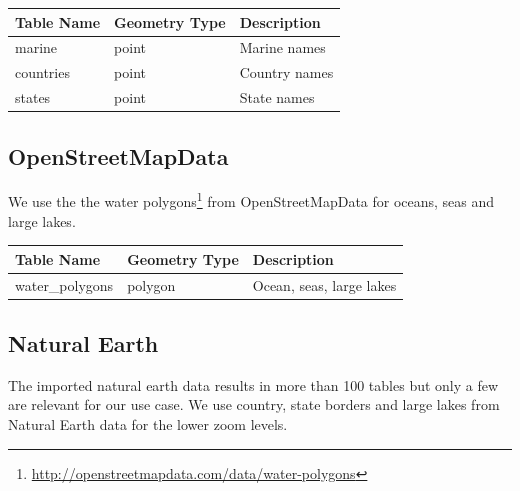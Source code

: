 \begin{flushleft}
    \begin{tabular}{lll}
    \hline
    Table Name   & Geometry Type & Description \\
    \hline                                          
    marine       & point    & Marine names \\
    countries    & point    & Country names \\
    states       & point    & State names \\
    \end{tabular}
\end{flushleft}

\subsection{OpenStreetMapData}

We use the the water polygons\footnote{\url{http://openstreetmapdata.com/data/water-polygons}} 
from OpenStreetMapData for oceans, seas and large lakes.

\begin{flushleft}
    \begin{tabular}{lll}
    \hline
    Table Name            & Geometry Type & Description \\
    \hline
    water\_polygons        & polygon       & Ocean, seas, large lakes           \\
    \end{tabular}
\end{flushleft}


\subsection{Natural Earth}


The imported natural earth data results in more than 100 tables but only a few
are relevant for our use case.
We use country, state borders and large lakes from Natural Earth data for the lower zoom
levels.


